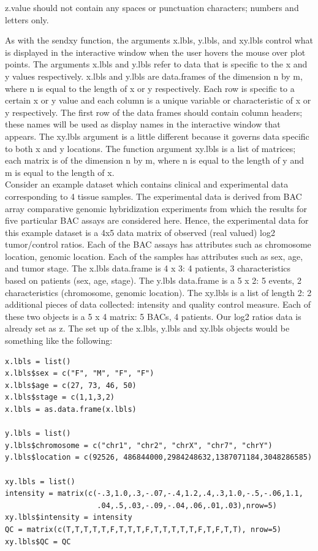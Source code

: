\documentclass[]{article}
\begin{document}
 z.value should not contain any spaces or punctuation characters; numbers and letters only.

\indent As with the sendxy function, the arguments x.lbls, y.lbls, and xy.lbls control what is displayed in the interactive window when the user hovers the mouse over plot points. The arguments x.lbls and y.lbls refer to data that is specific to the x and y values respectively. x.lbls and y.lbls are data.frames of the dimension n by m, where n is equal to the length of x or y respectively. Each row is specific to a certain x or y value and each column is a unique variable or characteristic of x or y respectively.  The first row of the data frames should contain column headers; these names will be used as display names in the interactive window that appears. The xy.lbls argument is a little different because it governs data specific to both x and y locations. The function argument xy.lbls is a list of matrices; each matrix is of the dimension n by m, where n is equal to the length of y and m is equal to the length of x.\\ 

\indent Consider an example dataset which contains clinical and experimental data corresponding to 4 tissue samples. The experimental data is derived from BAC array comparative genomic hybridization experiments from which the results for five particular BAC assays are considered here. Hence, the experimental data for this example dataset is a 4x5 data matrix of observed (real valued) log2 tumor/control ratios. Each of the BAC assays has attributes such as chromosome location, genomic location. Each of the samples has attributes such as sex, age, and tumor stage. The x.lbls data.frame is 4 x 3: 4 patients, 3 characteristics based on patients (sex, age, stage). The y.lbls data.frame is a 5 x 2: 5 events, 2 characteristics (chromosome, genomic location).  The xy.lbls is a list of length 2: 2 additional pieces of data collected: intensity and quality control measure. Each of these two objects is a 5 x 4 matrix: 5 BACs, 4 patients. Our log2 ratios data is already set as z. The set up of the x.lbls, y.lbls and xy.lbls objects would be something like the following:

\begin{verbatim}
x.lbls = list()
x.lbls$sex = c("F", "M", "F", "F")
x.lbls$age = c(27, 73, 46, 50)
x.lbls$stage = c(1,1,3,2)
x.lbls = as.data.frame(x.lbls)

y.lbls = list()
y.lbls$chromosome = c("chr1", "chr2", "chrX", "chr7", "chrY")
y.lbls$location = c(92526, 486844000,2984248632,1387071184,3048286585)

xy.lbls = list()
intensity = matrix(c(-.3,1.0,.3,-.07,-.4,1.2,.4,.3,1.0,-.5,-.06,1.1,
                     .04,.5,.03,-.09,-.04,.06,.01,.03),nrow=5)
xy.lbls$intensity = intensity
QC = matrix(c(T,T,T,T,T,F,T,T,T,F,T,T,T,T,T,F,T,F,T,T), nrow=5)
xy.lbls$QC = QC

\end{verbatim}
\end{document}
